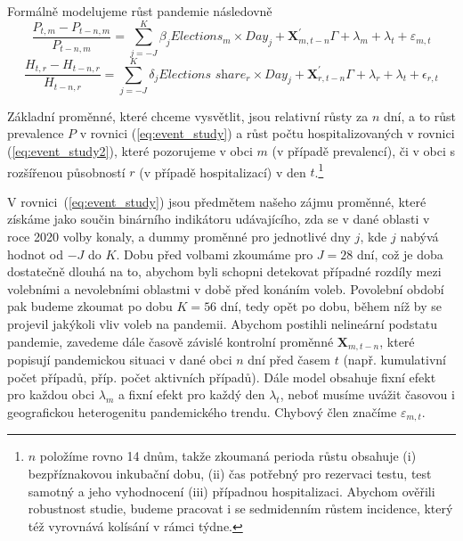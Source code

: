 Formálně modelujeme růst pandemie následovně
\begin{equation}
\label{eq:event_study}
\frac{P_{t,m} - P_{t-n,m}}{P_{t-n,m}} = \sum_{j=-J}^{K} \beta_j \textit{Elections}_m \times Day_j + \textbf{X}_{m,t-n}^{'}\Gamma + \lambda_{m} + \lambda_{t} + \varepsilon_{m,t}
\end{equation}
\begin{equation}
\label{eq:event_study2}
\frac{H_{t,r} - H_{t-n,r}}{H_{t-n,r}} = \sum_{j=-J}^{K} \delta_j \textit{Elections share}_r \times Day_j + \textbf{X}_{r,t-n}^{'}\Gamma + \lambda_{r} + \lambda_{t} + \epsilon_{r,t}
\end{equation}

Základní proměnné, které chceme vysvětlit, jsou relativní růsty za $n$ dní, a to růst prevalence $P$ v rovnici (\ref{eq:event_study}) a růst počtu hospitalizovaných v rovnici (\ref{eq:event_study2}), které pozorujeme v obci $m$ (v případě prevalencí), či v obci s rozšířenou působností $r$ (v případě hospitalizací) v den $t$.\footnote{$n$ položíme rovno 14 dnům, takže zkoumaná perioda růstu obsahuje
(i) bezpříznakovou inkubační dobu\cite{lauer_et_al2020}, (ii) čas potřebný pro rezervaci testu, test samotný a jeho vyhodnocení (iii) případnou hospitalizaci. Abychom ověřili robustnost studie, budeme pracovat i se sedmidenním růstem incidence, který též vyrovnává kolísání v rámci týdne.}


V rovnici~(\ref{eq:event_study}) jsou předmětem našeho zájmu proměnné, které získáme jako součin binárního indikátoru udávajícího, zda se v dané oblasti v roce 2020 volby konaly, a dummy proměnné pro jednotlivé dny $j$, kde $j$ nabývá hodnot od $-J$ do $K$. 
Dobu před volbami zkoumáme pro $J=28$ dní, což je doba dostatečně dlouhá na to, abychom byli schopni detekovat případné rozdíly mezi volebními a nevolebními oblastmi v době před konáním voleb. Povolební období pak budeme zkoumat po dobu $K=56$ dní, tedy opět po dobu, během níž by se projevil jakýkoli vliv voleb na pandemii. Abychom postihli nelineární podstatu pandemie, zavedeme dále časově závislé kontrolní proměnné $\textbf{X}_{m,t-n}$, které popisují pandemickou situaci v dané obci $n$ dní před časem $t$ (např. kumulativní počet případů, příp. počet aktivních případů). Dále model obsahuje fixní efekt pro každou obci $\lambda_{m}$ a fixní efekt pro každý den $\lambda_{t}$, neboť musíme uvážit časovou i geografickou heterogenitu pandemického trendu. Chybový člen značíme
 $\varepsilon_{m,t}$.

